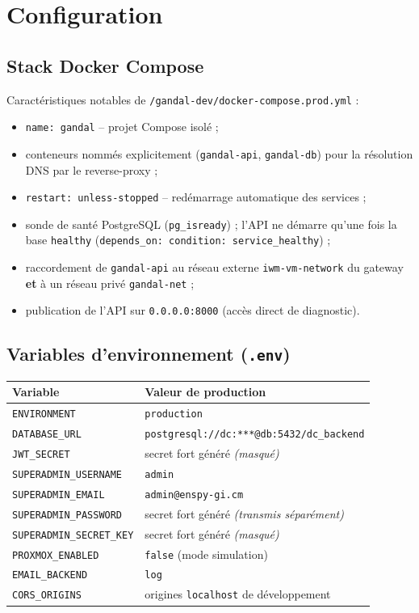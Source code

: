 \documentclass[11pt,a4paper]{article}
\newcommand{\code}[1]{\texttt{\small #1}}
\begin{document}
\section{Configuration}

\subsection{Stack Docker Compose}

Caractéristiques notables de \code{/gandal-dev/docker-compose.prod.yml} :
\begin{itemize}
  \item \code{name: gandal} -- projet Compose isolé ;
  \item conteneurs nommés explicitement (\code{gandal-api}, \code{gandal-db}) pour la
        résolution DNS par le reverse-proxy ;
  \item \code{restart: unless-stopped} -- redémarrage automatique des services ;
  \item sonde de santé PostgreSQL (\code{pg\_isready}) ; l'API ne démarre qu'une fois la
        base \code{healthy} (\code{depends\_on: condition: service\_healthy}) ;
  \item raccordement de \code{gandal-api} au réseau externe \code{iwm-vm-network} du
        gateway \textbf{et} à un réseau privé \code{gandal-net} ;
  \item publication de l'API sur \code{0.0.0.0:8000} (accès direct de diagnostic).
\end{itemize}

\subsection{Variables d'environnement (\code{.env})}

\begin{tabularx}{\linewidth}{@{}l X@{}}
\toprule
\textbf{Variable} & \textbf{Valeur de production} \\
\midrule
\code{ENVIRONMENT} & \code{production} \\
\code{DATABASE\_URL} & \code{postgresql://dc:***@db:5432/dc\_backend} \\
\code{JWT\_SECRET} & secret fort généré \textit{(masqué)} \\
\code{SUPERADMIN\_USERNAME} & \code{admin} \\
\code{SUPERADMIN\_EMAIL} & \code{admin@enspy-gi.cm} \\
\code{SUPERADMIN\_PASSWORD} & secret fort généré \textit{(transmis séparément)} \\
\code{SUPERADMIN\_SECRET\_KEY} & secret fort généré \textit{(masqué)} \\
\code{PROXMOX\_ENABLED} & \code{false} (mode simulation) \\
\code{EMAIL\_BACKEND} & \code{log} \\
\code{CORS\_ORIGINS} & origines \code{localhost} de développement \\
\bottomrule
\end{tabularx}
\end{document}
